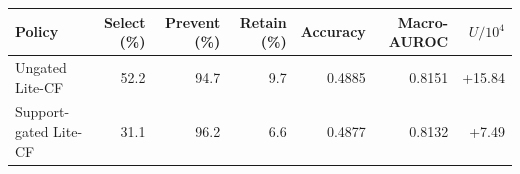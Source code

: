 \begin{tabular}{lrrrrrr}
\toprule
Policy & Select (\%) & Prevent (\%) & Retain (\%) & Accuracy & Macro-AUROC & $U/10^4$ \\
\midrule
Ungated Lite-CF & 52.2 & 94.7 & 9.7 & 0.4885 & 0.8151 & +15.84 \\
Support-gated Lite-CF & 31.1 & 96.2 & 6.6 & 0.4877 & 0.8132 & +7.49 \\ 
\bottomrule
\end{tabular}
